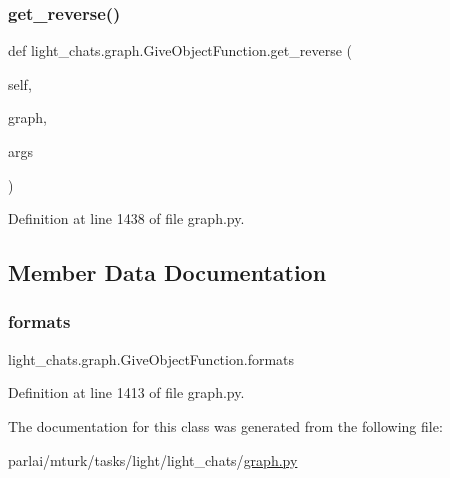 \subsubsection{\texorpdfstring{get\+\_\+reverse()}{get\_reverse()}}
{\footnotesize\ttfamily def light\+\_\+chats.\+graph.\+Give\+Object\+Function.\+get\+\_\+reverse (\begin{DoxyParamCaption}\item[{}]{self,  }\item[{}]{graph,  }\item[{}]{args }\end{DoxyParamCaption})}



Definition at line 1438 of file graph.\+py.



\subsection{Member Data Documentation}
\mbox{\label{classlight__chats_1_1graph_1_1GiveObjectFunction_a0fec6f9aa2b89ddc4ab44917d13eaaf6}} 
\subsubsection{\texorpdfstring{formats}{formats}}
{\footnotesize\ttfamily light\+\_\+chats.\+graph.\+Give\+Object\+Function.\+formats}



Definition at line 1413 of file graph.\+py.



The documentation for this class was generated from the following file\+:\begin{DoxyCompactItemize}
\item 
parlai/mturk/tasks/light/light\+\_\+chats/\hyperlink{parlai_2mturk_2tasks_2light_2light__chats_2graph_8py}{graph.\+py}\end{DoxyCompactItemize}
